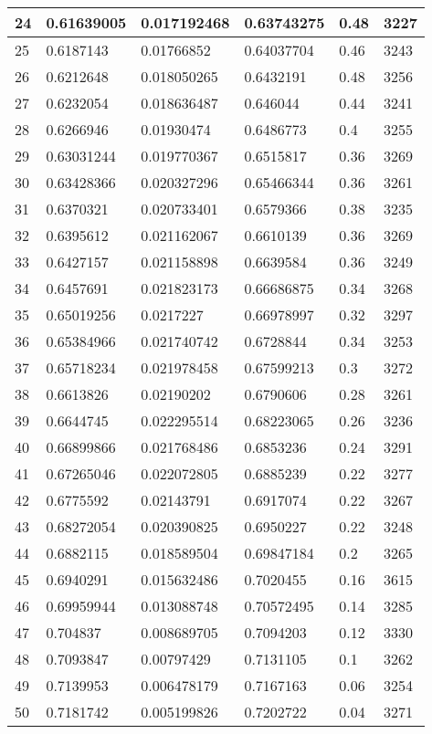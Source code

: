 \begin{longtable}{|l|l|l|l|l|l|}
24 & 0.61639005 & 0.017192468 & 0.63743275 & 0.48 & 3227 \\ \hline 
25 & 0.6187143 & 0.01766852 & 0.64037704 & 0.46 & 3243 \\ \hline 
26 & 0.6212648 & 0.018050265 & 0.6432191 & 0.48 & 3256 \\ \hline 
27 & 0.6232054 & 0.018636487 & 0.646044 & 0.44 & 3241 \\ \hline 
28 & 0.6266946 & 0.01930474 & 0.6486773 & 0.4 & 3255 \\ \hline 
29 & 0.63031244 & 0.019770367 & 0.6515817 & 0.36 & 3269 \\ \hline 
30 & 0.63428366 & 0.020327296 & 0.65466344 & 0.36 & 3261 \\ \hline 
31 & 0.6370321 & 0.020733401 & 0.6579366 & 0.38 & 3235 \\ \hline 
32 & 0.6395612 & 0.021162067 & 0.6610139 & 0.36 & 3269 \\ \hline 
33 & 0.6427157 & 0.021158898 & 0.6639584 & 0.36 & 3249 \\ \hline 
34 & 0.6457691 & 0.021823173 & 0.66686875 & 0.34 & 3268 \\ \hline 
35 & 0.65019256 & 0.0217227 & 0.66978997 & 0.32 & 3297 \\ \hline 
36 & 0.65384966 & 0.021740742 & 0.6728844 & 0.34 & 3253 \\ \hline 
37 & 0.65718234 & 0.021978458 & 0.67599213 & 0.3 & 3272 \\ \hline 
38 & 0.6613826 & 0.02190202 & 0.6790606 & 0.28 & 3261 \\ \hline 
39 & 0.6644745 & 0.022295514 & 0.68223065 & 0.26 & 3236 \\ \hline 
40 & 0.66899866 & 0.021768486 & 0.6853236 & 0.24 & 3291 \\ \hline 
41 & 0.67265046 & 0.022072805 & 0.6885239 & 0.22 & 3277 \\ \hline 
42 & 0.6775592 & 0.02143791 & 0.6917074 & 0.22 & 3267 \\ \hline 
43 & 0.68272054 & 0.020390825 & 0.6950227 & 0.22 & 3248 \\ \hline 
44 & 0.6882115 & 0.018589504 & 0.69847184 & 0.2 & 3265 \\ \hline 
45 & 0.6940291 & 0.015632486 & 0.7020455 & 0.16 & 3615 \\ \hline 
46 & 0.69959944 & 0.013088748 & 0.70572495 & 0.14 & 3285 \\ \hline 
47 & 0.704837 & 0.008689705 & 0.7094203 & 0.12 & 3330 \\ \hline 
48 & 0.7093847 & 0.00797429 & 0.7131105 & 0.1 & 3262 \\ \hline 
49 & 0.7139953 & 0.006478179 & 0.7167163 & 0.06 & 3254 \\ \hline 
50 & 0.7181742 & 0.005199826 & 0.7202722 & 0.04 & 3271 \\ \hline 
\end{longtable}